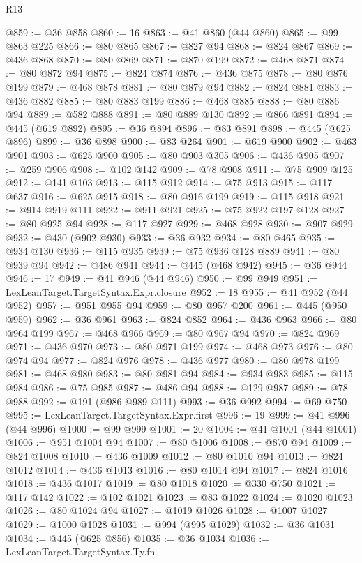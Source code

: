 \begin{lexlean}{R13}
\begin{coremodule}
@859 := @36 @858
@860 := 16
@863 := @41 @860 (@44 @860)
@865 := @99 @863 @225
@866 := @80 @865
@867 := @827 @94
@868 := @824 @867
@869 := @436 @868
@870 := @80 @869
@871 := @870 @199
@872 := @468 @871
@874 := @80 @872 @94
@875 := @824 @874
@876 := @436 @875
@878 := @80 @876 @199
@879 := @468 @878
@881 := @80 @879 @94
@882 := @824 @881
@883 := @436 @882
@885 := @80 @883 @199
@886 := @468 @885
@888 := @80 @886 @94
@889 := @582 @888
@891 := @80 @889 @130
@892 := @866 @891
@894 := @445 (@619 @892)
@895 := @36 @894
@896 := @83 @891
@898 := @445 (@625 @896)
@899 := @36 @898
@900 := @83 @264
@901 := @619 @900
@902 := @463 @901
@903 := @625 @900
@905 := @80 @903 @305
@906 := @436 @905
@907 := @259 @906
@908 := @102 @142
@909 := @78 @908
@911 := @75 @909 @125
@912 := @141 @103
@913 := @115 @912
@914 := @75 @913
@915 := @117 @637
@916 := @625 @915
@918 := @80 @916 @199
@919 := @115 @918
@921 := @914 @919 @111
@922 := @911 @921
@925 := @75 @922 @197 @128
@927 := @80 @925 @94
@928 := @117 @927
@929 := @468 @928
@930 := @907 @929
@932 := @430 (@902 @930)
@933 := @36 @932
@934 := @80 @465
@935 := @934 @130
@936 := @115 @935
@939 := @75 @936 @128 @889
@941 := @80 @939 @94
@942 := @486 @941
@944 := @445 (@468 @942)
@945 := @36 @944
@946 := 17
@949 := @41 @946 (@44 @946)
@950 := @99 @949
@951 := LexLeanTarget.TargetSyntax.Expr.closure
@952 := 18
@955 := @41 @952 (@44 @952)
@957 := @951 @955 @94
@959 := @80 @957 @200
@961 := @445 (@950 @959)
@962 := @36 @961
@963 := @824 @852
@964 := @436 @963
@966 := @80 @964 @199
@967 := @468 @966
@969 := @80 @967 @94
@970 := @824 @969
@971 := @436 @970
@973 := @80 @971 @199
@974 := @468 @973
@976 := @80 @974 @94
@977 := @824 @976
@978 := @436 @977
@980 := @80 @978 @199
@981 := @468 @980
@983 := @80 @981 @94
@984 := @934 @983
@985 := @115 @984
@986 := @75 @985
@987 := @486 @94
@988 := @129 @987
@989 := @78 @988
@992 := @191 (@986 @989 @111)
@993 := @36 @992
@994 := @69 @750
@995 := LexLeanTarget.TargetSyntax.Expr.first
@996 := 19
@999 := @41 @996 (@44 @996)
@1000 := @99 @999
@1001 := 20
@1004 := @41 @1001 (@44 @1001)
@1006 := @951 @1004 @94
@1007 := @80 @1006
@1008 := @870 @94
@1009 := @824 @1008
@1010 := @436 @1009
@1012 := @80 @1010 @94
@1013 := @824 @1012
@1014 := @436 @1013
@1016 := @80 @1014 @94
@1017 := @824 @1016
@1018 := @436 @1017
@1019 := @80 @1018
@1020 := @330 @750
@1021 := @117 @142
@1022 := @102 @1021
@1023 := @83 @1022
@1024 := @1020 @1023
@1026 := @80 @1024 @94
@1027 := @1019 @1026
@1028 := @1007 @1027
@1029 := @1000 @1028
@1031 := @994 (@995 @1029)
@1032 := @36 @1031
@1034 := @445 (@625 @856)
@1035 := @36 @1034
@1036 := LexLeanTarget.TargetSyntax.Ty.fn

\end{coremodule}
\end{lexlean}
